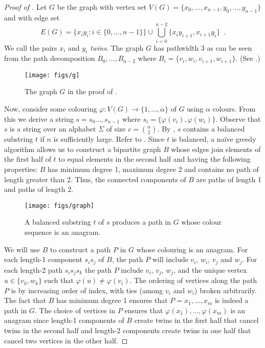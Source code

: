 \documentclass{patmorin}
\begin{document}
\begin{proof}[Proof of ]
Let $G$ be the graph with vertex set
$V(G)=\{x_0,\ldots,x_{n-1},y_0,\ldots,y_{n-1}\}$ and with edge set
\[
  E(G) = \{x_iy_i : i\in\{0,\ldots,n-1\}\} \cup \bigcup_{i=0}^{n-2} \{x_iy_{i+1},x_{i+1}y_i\} \enspace .
\]
We call the pairs $x_i$ and $y_i$ \emph{twins}.
The graph $G$ has pathwidth 3 as can be seen from the path decomposition $B_0,\ldots,B_{n-2}$ where $B_i=\{v_i,w_i,v_{i+1},w_{i+1}\}$.
(See .)

\begin{figure}
  \begin{center}
    \texttt{[image: figs/g]}
  \end{center}
  \caption{The graph $G$ in the proof of .}
\end{figure}

Now, consider some colouring $\varphi:V(G)\to\{1,\ldots,\alpha\}$ of $G$
using $\alpha$ colours. From this we derive a string $s=s_0\ldots,s_{n-1}$
where $s_i=\{\varphi(v_i),\varphi(w_i)\}$.  Observe that $s$ is
a string over an alphabet $\Sigma$ of size $c=\binom{\alpha}{2}$.
By , $s$ contains a balanced substring $t$ if $n$
is sufficiently large.  Refer to . Since $t$
is balanced, a na\"ive greedy algorithm allows us to construct a bipartite
 graph $B$ whose edges join
elements of the first half of $t$ to equal elements in the second half
and having the following properties: $B$ has minimum degree 1, maximum
degree 2 and contains no path of length greater than 2.  Thus, the
connected components of $B$ are paths of length 1 and paths of length 2.

\begin{figure}
  \begin{center}
    \texttt{[image: figs/graph]}
  \end{center}
  \caption{A balanced substring $t$ of $s$ produces a path in $G$ whose
    colour sequence is an anagram.}
\end{figure}



We will use $B$ to construct a path $P$ in $G$ whose colouring is an
anagram.  For each length-1 component $s_is_j$ of $B$, the path $P$
will include $v_i$, $w_i$, $v_j$ and $w_j$.  For each length-2 path
$s_is_js_k$ the path $P$ include $v_i$, $v_j$, $w_j$, and the unique
vertex $u\in\{v_k,w_k\}$ such that $\varphi(u)\neq \varphi(v_i)$.
The ordering of vertices along the path $P$ is by increasing order
of index, with ties (among $v_i$ and $w_i$) broken arbitrarily.
The fact that $B$ has minimum degree 1 ensures that $P=x_1,\ldots,x_m$
is indeed a path in $G$.  The choice of vertices in $P$ ensures that
$\varphi(x_1),\ldots,\varphi(x_m)$ is an anagram since length-1 components
of $B$ create twins in the first half that cancel twins in the second
half and length-2 components create twins in one half that cancel two
vertices in the other half.
\end{proof}
\end{document}
